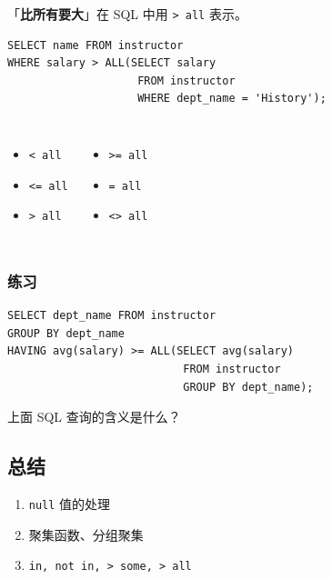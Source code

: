 \documentclass[aspectratio=169, 14pt]{beamer}
\begin{document}
\begin{frame}[fragile]
	「\textbf{比所有要大}」在 SQL 中用 \texttt{> all} 表示。

	\begin{verbatim}
SELECT name FROM instructor
WHERE salary > ALL(SELECT salary
                    FROM instructor
                    WHERE dept_name = 'History');
    \end{verbatim}
	\pause
	\begin{columns}
		\begin{itemize}
			\item \texttt{< all}
			\item \texttt{<= all}
			\item \texttt{> all}
		\end{itemize}
		\begin{itemize}
			\item \texttt{>= all}
			\item \texttt{= all}
			\item \texttt{<> all}
		\end{itemize}
	\end{columns}
\end{frame}

\begin{frame}[fragile]
	\frametitle{练习 {\large {}} }
	\begin{verbatim}
SELECT dept_name FROM instructor
GROUP BY dept_name
HAVING avg(salary) >= ALL(SELECT avg(salary)
                           FROM instructor
                           GROUP BY dept_name);
    \end{verbatim}
	上面 SQL 查询的含义是什么？
\end{frame}

\begin{frame}
	\section{\textcolor{darkmidnightblue}{总结}}

	\begin{enumerate}
		\item \texttt{null} 值的处理
		\item 聚集函数、分组聚集
		\item \texttt{in, not in, > some, > all}
	\end{enumerate}
\end{frame}
\end{document}
